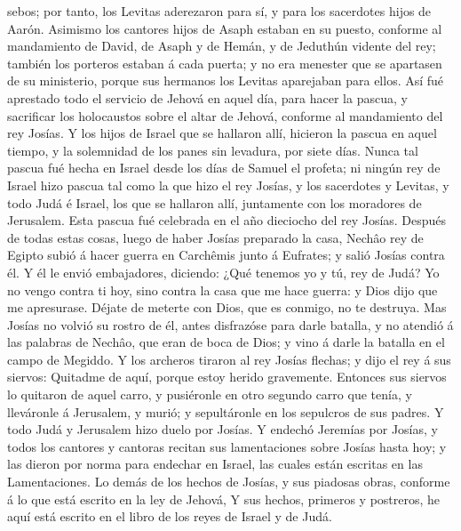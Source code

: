 sebos; por tanto, los Levitas aderezaron para sí, y para los sacerdotes
hijos de Aarón.  Asimismo los cantores hijos de Asaph
estaban en su puesto, conforme al mandamiento de David, de Asaph y de
Hemán, y de Jeduthún vidente del rey; también los porteros estaban á
cada puerta; y no era menester que se apartasen de su ministerio, porque
sus hermanos los Levitas aparejaban para ellos.  Así fué
aprestado todo el servicio de Jehová en aquel día, para hacer la pascua,
y sacrificar los holocaustos sobre el altar de Jehová, conforme al
mandamiento del rey Josías.  Y los hijos de Israel que se
hallaron allí, hicieron la pascua en aquel tiempo, y la solemnidad de
los panes sin levadura, por siete días.  Nunca tal pascua
fué hecha en Israel desde los días de Samuel el profeta; ni ningún rey
de Israel hizo pascua tal como la que hizo el rey Josías, y los
sacerdotes y Levitas, y todo Judá é Israel, los que se hallaron allí,
juntamente con los moradores de Jerusalem.  Esta pascua
fué celebrada en el año dieciocho del rey Josías. 
Después de todas estas cosas, luego de haber Josías preparado la casa,
Nechâo rey de Egipto subió á hacer guerra en Carchêmis junto á Eufrates;
y salió Josías contra él.  Y él le envió embajadores,
diciendo: ¿Qué tenemos yo y tú, rey de Judá? Yo no vengo contra ti hoy,
sino contra la casa que me hace guerra: y Dios dijo que me apresurase.
Déjate de meterte con Dios, que es conmigo, no te destruya.
 Mas Josías no volvió su rostro de él, antes disfrazóse
para darle batalla, y no atendió á las palabras de Nechâo, que eran de
boca de Dios; y vino á darle la batalla en el campo de Megiddo.
 Y los archeros tiraron al rey Josías flechas; y dijo el
rey á sus siervos: Quitadme de aquí, porque estoy herido gravemente.
 Entonces sus siervos lo quitaron de aquel carro, y
pusiéronle en otro segundo carro que tenía, y lleváronle á Jerusalem, y
murió; y sepultáronle en los sepulcros de sus padres. Y todo Judá y
Jerusalem hizo duelo por Josías.  Y endechó Jeremías por
Josías, y todos los cantores y cantoras recitan sus lamentaciones sobre
Josías hasta hoy; y las dieron por norma para endechar en Israel, las
cuales están escritas en las Lamentaciones.  Lo demás de
los hechos de Josías, y sus piadosas obras, conforme á lo que está
escrito en la ley de Jehová,  Y sus hechos, primeros y
postreros, he aquí está escrito en el libro de los reyes de Israel y de
Judá.

